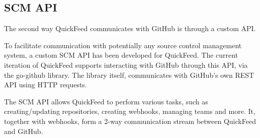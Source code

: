 \subsection{SCM API}

The second way QuickFeed communicates with GitHub is through a custom API.

To facilitate communication with potentially any source control management system, a custom SCM API has been developed for QuickFeed.
The current iteration of QuickFeed supports interacting with GitHub through this API, via the go-github library. %
The library itself, communicates with GitHub's own REST API using HTTP requests.

The SCM API allows QuickFeed to perform various tasks, such as creating/updating repositories, creating webhooks, managing teams and more.
It, together with webhooks, form a 2-way communication stream between QuickFeed and GitHub.